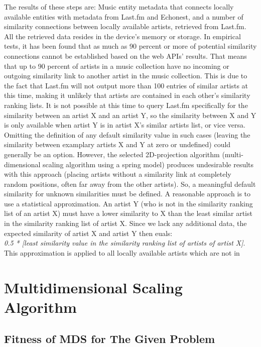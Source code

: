 The results of these steps are: Music entity metadata that connects locally available entities with metadata from Last.fm and Echonest, and a number of similarity connections between locally available artists, retrieved from Last.fm. All the retrieved data resides in the device's memory or storage. In empirical tests, it has been found that as much as 90 percent or more of potential similarity connections cannot be established based on the web APIs' results. That means that up to 90 percent of artists in a music collection have no incoming or outgoing similarity link to another artist in the music collection. This is due to the fact that Last.fm will not output more than 100 entries of similar artists at this time, making it unlikely that artists are contained in each other's similarity ranking lists. It is not possible at this time to query Last.fm specifically for the similarity between an artist X and an artist Y, so the similarity between X and Y is only available when artist Y is in artist X's similar artists list, or vice versa. 
Omitting the definition of any default similarity value in such cases (leaving the similarity between examplary artists X and Y at zero or undefined) could generally be an option. However, the selected 2D-projection algorithm (multi-dimensional scaling algorithm using a spring model) produces undesirable results with this approach (placing artists without a similarity link at completely random positions, often far away from the other artists).
So, a meaningful default similarity for unknown similarities must be defined. A reasonable approach is to use a statistical approximation. An artist Y (who is not in the similarity ranking list of an artist X) must have a lower similarity to X than the least similar artist in the similarity ranking list of artist X. Since we lack any additional data, the expected similarity of artist X and artist Y then euals:\\
\emph{0.5 * [least similarity value in the similarity ranking list of artists of artist X]}.\\
This approximation is applied to all locally available artists which are not in 

\section{Multidimensional Scaling Algorithm}
\label{sec:mds-algorithm}

\subsection{Fitness of MDS for The Given Problem}

